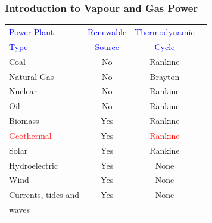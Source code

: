 \documentclass[10pt,compress]{beamer}
\begin{document}
\begin{frame}
 \frametitle{Introduction to Vapour and Gas Power}

    \begin{center}
     \begin{table}
       \begin{tabular}{l c c c}
    \hline
    \textcolor{blue}{Power Plant} & \textcolor{blue}{Renewable}  & \textcolor{blue}{Thermodynamic} \\
    \textcolor{blue}{Type}        & \textcolor{blue}{Source}     & \textcolor{blue}{Cycle}         \\
    \hline
      Coal                        &   No                         & Rankine  \\
      Natural Gas                 &   No                         & Brayton  \\
      Nuclear                     &   No                         & Rankine  \\
      Oil                         &   No                         & Rankine  \\
      Biomass                     &   Yes                        & Rankine  \\
      \textcolor{red}{Geothermal} &   Yes                        & \textcolor{red}{Rankine}  \\
      Solar                       &   Yes                        & Rankine  \\
      Hydroelectric               &   Yes                        & None     \\
      Wind                        &   Yes                        & None     \\
      Currents, tides and         &   Yes                        & None     \\
      waves                       &                              &          \\
      \end{tabular}
     \end{table}
    \end{center}
\end{frame}
\end{document}
